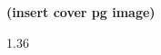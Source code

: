 \documentclass[10pt, letterpaper]{article}
\newcommand{\HTwoSize}{\fontsize{13}{16}\selectfont}
\newcommand{\TOCFontSizePt}{9}
\newcommand{\TOCFontCmd}{%
  \fontsize{\TOCFontSizePt}{\dimexpr \TOCFontSizePt pt * 12 / 10\relax}\selectfont
}
\newcommand{\TOCLineStretch}{1.36}
\begin{document}
\thispagestyle{empty}
\vspace*{\fill}
\begin{center}
  {\HTwoSize\bfseries \textcolor{DBFDark}{(insert cover pg image)}\par}
\end{center}
\vspace*{\fill}
\newpage

\begingroup
  \TOCFontCmd
  \begin{spacing}{\TOCLineStretch}
    \setlength{\parskip}{0pt}
    \setlength{\cftbeforetoctitleskip}{0pt}
    \setlength{\cftaftertoctitleskip}{6pt}
    \tableofcontents
  \end{spacing}
\endgroup
\thispagestyle{fancy}
\end{document}
